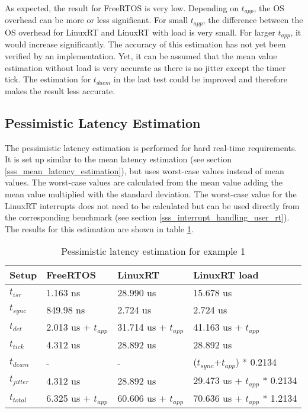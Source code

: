 As expected, the result for FreeRTOS is very low. 
Depending on $t_{app}$, the \ac{OS} overhead can be more or less significant. 
For small $t_{app}$, the difference between the \ac{OS} overhead for LinuxRT and LinuxRT with load is very small. 
For larger $t_{app}$, it would increase significantly. 
The accuracy of this estimation has not yet been verified by an implementation.
Yet, it can be assumed that the mean value estimation without load is very accurate as there is no jitter except the timer tick.
The estimation for $t_{daem}$ in the last test could be improved and therefore makes the result less accurate.
   
\subsection{Pessimistic Latency Estimation}\label{sss_pessimistic_latency_estimation}
The pessimistic latency estimation is performed for hard real-time requirements. 
It is set up similar to the mean latency estimation (see section \ref{sss_mean_latency_estimation}), but uses worst-case values instead of mean values. 
The worst-case values are calculated from the mean value adding the mean value multiplied with the standard deviation.
The worst-case value for the LinuxRT interrupts does not need to be calculated but can be used directly from the corresponding benchmark (see section \ref{sss_interrupt_handling_user_rt}). 
The results for this estimation are shown in table \ref{tab_example1_pessimistic}.  
 \begin{table}[htbp]
	\centering
		\begin{tabular}{|l|l|l|l|}
			\hline
				Setup					& FreeRTOS 								& LinuxRT 							& LinuxRT load  \\
				\hline 
				$t_{isr}$ 		& 1.163 ns 								& 28.990 us 						& 15.678 us			\\
			  $t_{sync}$		& 849.98 ns	  						& 2.724 us 				 			& 2.724 us			\\
			  \hline 
			  $t_{det}$			& 2.013 us + $t_{app}$		& 31.714 us + $t_{app}$	& 41.163 us	+ $t_{app}$		\\ 
			  \hline
			  \hline
			  $t_{tick}$		& 4.312 us								& 28.892 us 					  & 28.892 us											\\
			  $t_{deam}$		& -				  							& - 				 						& ($t_{sync}$+$t_{app}$) * 0.2134	\\ 
				\hline 
			  $t_{jitter}$	& 4.312 us  							& 28.892 us						  & 29.473 us	+ $t_{app}$ * 0.2134	\\ 
			  \hline
			  \hline 
			  $t_{total}$		& 6.325 us + $t_{app}$	 & 60.606 us + $t_{app}$  &	70.636 us + $t_{app}$ * 1.2134 	\\ 
			\hline
		\end{tabular}
	\caption{Pessimistic latency estimation for example 1}
	\label{tab_example1_pessimistic}
\end{table}
